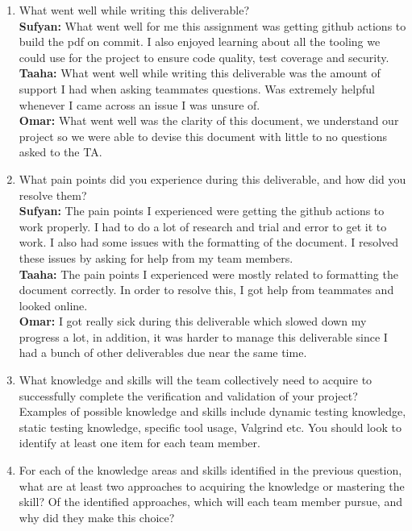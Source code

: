 \documentclass[12pt, titlepage]{article}
\begin{document}
\begin{enumerate}
  \item What went well while writing this deliverable? \\
  \textbf{Sufyan:} What went well for me this assignment was getting github actions to build the pdf on commit. I also enjoyed learning about all the tooling we could use for the project to ensure code quality, test coverage and security. \\
  \textbf{Taaha:} What went well while writing this deliverable was the amount of support I had when asking teammates questions. Was extremely helpful whenever I came across an issue I was unsure of. \\
  \textbf{Omar:} What went well was the clarity of this document, we understand our project so we were able to devise this document with little to no questions asked to the TA. \\
  \item What pain points did you experience during this deliverable, and how
    did you resolve them? \\
  \textbf{Sufyan:} The pain points I experienced were getting the github actions to work properly. I had to do a lot of research and trial and error to get it to work. I also had some issues with the formatting of the document. I resolved these issues by asking for help from my team members. \\
  \textbf{Taaha:} The pain points I experienced were mostly related to formatting the document correctly. In order to resolve this, I got help from teammates and looked online. \\
  \textbf{Omar:} I got really sick during this deliverable which slowed down my progress a lot, in addition, it was harder to manage this deliverable since I had a bunch of other deliverables due near the same time. \\
  \item What knowledge and skills will the team collectively need to acquire to
  successfully complete the verification and validation of your project?
  Examples of possible knowledge and skills include dynamic testing knowledge,
  static testing knowledge, specific tool usage, Valgrind etc.  You should look to
  identify at least one item for each team member.
  \item For each of the knowledge areas and skills identified in the previous
  question, what are at least two approaches to acquiring the knowledge or
  mastering the skill?  Of the identified approaches, which will each team
  member pursue, and why did they make this choice?
\end{enumerate}
\end{document}
